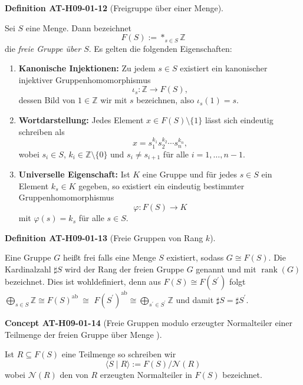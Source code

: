 \documentclass[10pt, letterpaper]{article}
\newcommand{\CustomHeading}[3]{%
  \par\medskip\noindent%
  \textbf{#1 #2} \textnormal{(#3)}.\enskip%
}
\newenvironment{DEF}[2]{\CustomHeading{Definition}{#1}{#2}}{}
\newenvironment{CONC}[2]{\CustomHeading{Concept}{#1}{#2}}{}
\begin{document}
\begin{DEF}{AT-H09-01-12}{Freigruppe über einer Menge}
Sei $S$ eine Menge. Dann bezeichnet
\[
F(S) := *_{s \in S} \mathbb{Z}
\]
die \emph{freie Gruppe über $S$}. Es gelten die folgenden Eigenschaften:

\begin{enumerate}[label=(\roman*)]
  \item \textbf{Kanonische Injektionen:}  
  Zu jedem $s \in S$ existiert ein kanonischer injektiver Gruppenhomomorphismus
  \[
  \iota_s : \mathbb{Z} \rightarrow F(S),
  \]
  dessen Bild von $1 \in \mathbb{Z}$ wir mit $s$ bezeichnen, also $\iota_s(1) = s$.

  \item \textbf{Wortdarstellung:}  
  Jedes Element $x \in F(S) \setminus \{1\}$ lässt sich eindeutig schreiben als
  \[
  x = s_1^{k_1} s_2^{k_2} \cdots s_n^{k_n},
  \]
  wobei $s_i \in S$, $k_i \in \mathbb{Z} \setminus \{0\}$ und $s_i \neq s_{i+1}$ für alle $i = 1, \dots, n-1$.

  \item \textbf{Universelle Eigenschaft:}  
  Ist $K$ eine Gruppe und für jedes $s \in S$ ein Element $k_s \in K$ gegeben, so existiert ein eindeutig bestimmter Gruppenhomomorphismus
  \[
  \varphi : F(S) \longrightarrow K
  \]
  mit $\varphi(s) = k_s$ für alle $s \in S$.
\end{enumerate}
\end{DEF}

\begin{DEF}{AT-H09-01-13}{Freie Gruppen von Rang $k$}
Eine Gruppe $G$ heißt frei falls eine Menge $S$ existiert, sodass $G \cong F(S)$. Die Kardinalzahl $\sharp S$ wird der Rang der freien Gruppe $G$ genannt und mit $\operatorname{rank}(G)$ bezeichnet. Dies ist wohldefiniert, denn aus $F(S) \cong F\left(S^{\prime}\right)$ folgt $\bigoplus_{s \in S} \mathbb{Z} \cong F(S)^{\text {ab }} \cong$ $F\left(S^{\prime}\right)^{\mathrm{ab}} \cong \bigoplus_{s^{\prime} \in S^{\prime}} \mathbb{Z}$ und damit $\sharp S=\sharp S^{\prime}$.
\end{DEF}

\begin{CONC}{AT-H09-01-14}{Freie Gruppen modulo erzeugter Normalteiler einer Teilmenge der freien Gruppe über Menge }
Ist $R \subseteq F(S)$ eine Teilmenge so schreiben wir 
$$\langle S \mid R\rangle:=F(S) / \mathcal{N}(R)$$ 
wobei $\mathcal{N}(R)$ den von $R$ erzeugten Normalteiler in $F(S)$ bezeichnet.
\end{CONC}
\end{document}
